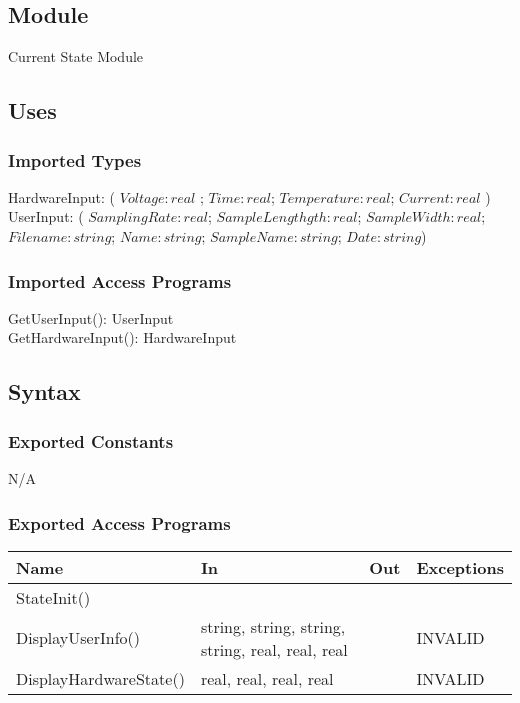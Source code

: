 \documentclass[12pt, titlepage]{article}
\begin{document}
\subsection{Module}

Current State Module

\subsection{Uses}

\subsubsection{Imported Types}

HardwareInput: ( $Voltage: real $ ; $Time: real$; $Temperature: real$; $Current: real$ )\\
UserInput: ( $SamplingRate: real$; $SampleLengthgth: real$; $SampleWidth: real$; $Filename: string$; $Name: string$; $SampleName: string$; $Date: string$)

\subsubsection{Imported Access Programs}

GetUserInput(): UserInput\\
GetHardwareInput(): HardwareInput\\ 


\subsection{Syntax}

\subsubsection{Exported Constants}

N/A
\subsubsection{Exported Access Programs}

\begin{center}
\begin{tabular}{p{5cm} p{5cm} p{1cm} p{3cm}}
\hline
\textbf{Name} & \textbf{In} & \textbf{Out} & \textbf{Exceptions} \\
\hline
StateInit() & &  &  \\
DisplayUserInfo() & string, string, string, string, real, real, real &  & INVALID \\
DisplayHardwareState() & real, real, real, real&  & INVALID \\
\hline
\end{tabular}
\end{center}
\end{document}
